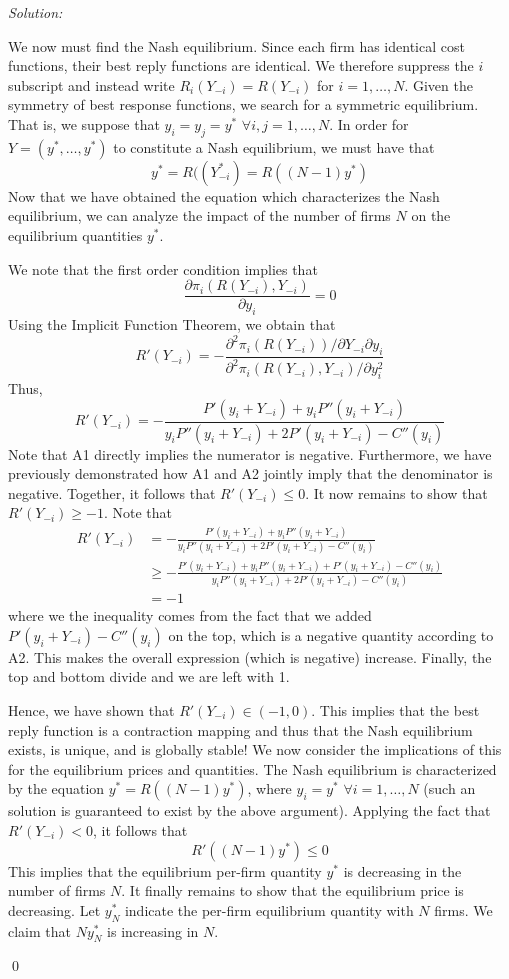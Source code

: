\documentclass[12pt]{article}
\newenvironment{sol}
    {\emph{Solution:}
    }
    {
    \qed
    }
\begin{document}
\begin{sol}
\begin{enumerate}[label=\alph*)]
    We now must find the Nash equilibrium. Since each firm has identical cost functions, their best reply functions are identical. We therefore suppress the $i$ subscript and instead write $R_{i}(Y_{-i}) = R(Y_{-i})$ for $i=1,\ldots, N$. Given the symmetry of best response functions, we search for a symmetric equilibrium. That is, we suppose that $y_i = y_{j} = y^*$ $\forall i,j = 1,\ldots,N$. In order for $Y = (y^*, \ldots, y^*)$ to constitute a Nash equilibrium, we must have that 
    \[y^* = R((Y_{-i}^*) = R((N-1)y^*)\]
    Now that we have obtained the equation which characterizes the Nash equilibrium, we can analyze the impact of the number of firms $N$ on the equilibrium quantities $y^*$. 
    
    We note that the first order condition implies that
    \[\frac{\partial \pi_i(R(Y_{-i}), Y_{-i})}{\partial y_i} = 0\]
    Using the Implicit Function Theorem, we obtain that
    \[R'(Y_{-i}) = -\frac{\partial^2 \pi_i(R(Y_{-i}))/\partial Y_{-i} \partial y_i}{\partial^2 \pi_i(R(Y_{-i}), Y_{-i})/\partial y_i^2}\]
    Thus,
    \[R'(Y_{-i}) = -\frac{P'(y_i + Y_{-i}) + y_i P''(y_i + Y_{-i})}{y_i P''(y_i + Y_{-i}) + 2 P'(y_i + Y_{-i}) - C''(y_i)}\]
    Note that A1 directly implies the numerator is negative. Furthermore, we have previously demonstrated how A1 and A2 jointly imply that the denominator is negative. Together, it follows that $R'(Y_{-i}) \leq 0$. It now remains to show that $R'(Y_{-i}) \geq -1$. Note that
    \begin{align*}
        R'(Y_{-i}) &= -\frac{P'(y_i + Y_{-i}) + y_i P''(y_i + Y_{-i})}{y_i P''(y_i + Y_{-i}) + 2 P'(y_i + Y_{-i}) - C''(y_i)}\\
        &\geq -\frac{P'(y_i + Y_{-i}) + y_i P''(y_i + Y_{-i}) + P'(y_i + Y_{-i}) - C''(y_i)}{y_i P''(y_i + Y_{-i}) + 2 P'(y_i + Y_{-i}) - C''(y_i)}\\
        &= -1
    \end{align*} 
    where we the inequality comes from the fact that we added $P'(y_i + Y_{-i}) - C''(y_i)$ on the top, which is a negative quantity according to A2. This makes the overall expression (which is negative) increase. Finally, the top and bottom divide and we are left with 1.

    Hence, we have shown that $R'(Y_{-i}) \in (-1, 0)$. This implies that the best reply function is a contraction mapping and thus that the Nash equilibrium exists, is unique, and is globally stable! We now consider the implications of this for the equilibrium prices and quantities. The Nash equilibrium is characterized by the equation $y^* = R((N-1)y^*)$, where $y_i = y^*$ $\forall i=1,\ldots, N$ (such an solution is guaranteed to exist by the above argument). Applying the fact that $R'(Y_{-i}) < 0$, it follows that
    \[R'((N-1)y^*) \leq 0\]
    This implies that the equilibrium per-firm quantity $y^*$ is decreasing in the number of firms $N$. It finally remains to show that the equilibrium price is decreasing. Let $y^*_N$ indicate the per-firm equilibrium quantity with $N$ firms. We claim that $Ny^*_N$ is increasing in $N$.


\end{enumerate}
\end{sol}
\end{document}
